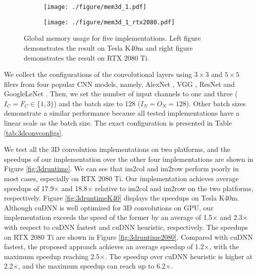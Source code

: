 \begin{figure*}
	
	\begin{subfigure}{\columnwidth}
		\centering
		 \texttt{[image: ./figure/mem3d\_1.pdf]}
		 \label{fig:3dmemk40m}
	\end{subfigure}
	\begin{subfigure}{\columnwidth}
		\centering
		 \texttt{[image: ./figure/mem3d\_1\_rtx2080.pdf]}
		 \label{fig:3dmemrtx2080}
	\end{subfigure}
	\caption{Global memory usage for five implementations. Left figure demonstrates the result on Tesla K40m and right figure demonstrates the result on RTX 2080 Ti.}
	\label{fig:3dmem}
\end{figure*}

We collect the configurations of the convolutional layers using $3 \times 3$ and $5 \times 5$ filers from four popular CNN models,
namely, AlexNet \cite{Krizhevsky2012ImageNet}, VGG \cite{SimonyanZ14a}, ResNet \cite{HeZRS16} and GoogleLeNet \cite{SzegedyLJSRAEVR15}.
Then, we set the number of input channels to one and three ($I_C=F_C \in \{1, 3\}$) and the batch size to 128 ($I_N=O_N=128$). Other batch
sizes demonstrate a similar performance because all tested implementations have a linear scale as the batch size. The exact configuration is presented in Table \ref{tab:3dconvconfigs}.

We test all the 3D convolution implementations on two platforms, and the speedups of our implementation over the other four implementations are shown
in Figure \ref{fig:3druntime}. We can see that im2col and im2row perform poorly in most cases, especially on RTX 2080 Ti. Our
implementation achieves average speedups of 17.9$\times$ and 18.8$\times$ relative to im2col and im2row on the two platforms, respectively. Figure \ref{fig:3druntimeK40} displays the speedups on Tesla K40m. Although cuDNN is well optimized for 3D convolutions on GPU, our implementation exceeds the speed of the former by an average of 1.5$\times$ and 2.3$\times$ with respect to cuDNN fastest and cuDNN heuristic, respectively. The speedups on RTX 2080 Ti are shown in Figure \ref{fig:3druntime2080}. Compared with cuDNN fastest, the proposed approach achieves an average speedup of 1.2$\times$, with the maximum speedup reaching 2.5$\times$. The speedup over cuDNN heuristic is higher at 2.2$\times$, and the maximum speedup can reach up to 6.2$\times$.

